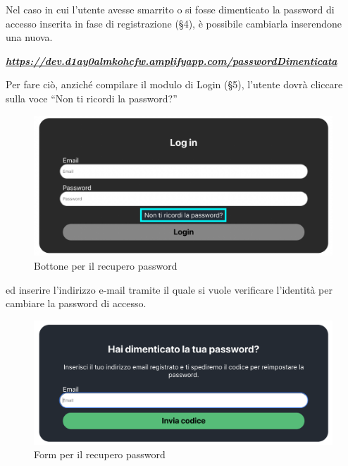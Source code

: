 
Nel caso in cui l'utente avesse smarrito o si fosse dimenticato la password di accesso inserita in fase di registrazione (\S{4}), è possibile cambiarla inserendone una nuova.

\begin{center}
\textsl{ \href{https://dev.d1ay0almkohcfw.amplifyapp.com/passwordDimenticata}{\textbf{https://dev.d1ay0almkohcfw.amplifyapp.com/passwordDimenticata} }}
\end{center}

Per fare ciò, anziché compilare il modulo di Login (\S{5}), l'utente dovrà cliccare sulla voce “Non ti ricordi la password?”

\begin{figure}[H]
\centering
\includegraphics[scale=0.2]{./images/RecuperoPassword/Login.png} 
\caption{Bottone per il recupero password}
\end{figure}

ed inserire l'indirizzo e-mail tramite il quale si vuole verificare l'identità per cambiare la password di accesso.

\begin{figure}[H]
\centering
\includegraphics[scale=0.3]{./images/RecuperoPassword/FormRecuperoPwd.png} 
\caption{Form per il recupero password}
\end{figure}

